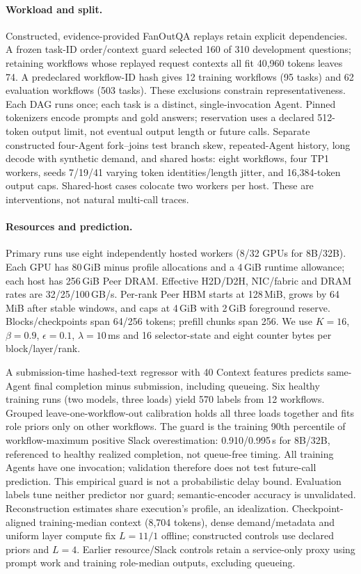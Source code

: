 \paragraph{Workload and split.}
Constructed, evidence-provided FanOutQA replays\cite{eval2024fanoutqa} retain
explicit dependencies. A frozen task-ID order/context guard selected 160 of
310 development questions; retaining workflows whose replayed request contexts
all fit 40,960 tokens leaves 74. A predeclared workflow-ID hash gives 12 training workflows (95 tasks) and
62 evaluation workflows (503 tasks). These exclusions constrain
representativeness. Each DAG runs once; each task is a distinct,
single-invocation Agent. Pinned tokenizers encode prompts and gold answers;
reservation uses a declared 512-token output limit, not eventual output length
or future calls.
Separate constructed four-Agent fork--joins test branch skew, repeated-Agent
history, long decode with synthetic demand, and shared hosts: eight workflows,
four TP1 workers, seeds 7/19/41 varying token identities/length jitter, and
16,384-token output caps. Shared-host cases colocate two workers per host.
These are interventions, not natural multi-call traces.

\paragraph{Resources and prediction.}
Primary runs use eight independently hosted workers (8/32 GPUs for 8B/32B).
Each GPU has 80\,GiB minus profile allocations and a 4\,GiB runtime allowance;
each host has 256\,GiB Peer DRAM. Effective H2D/D2H, NIC/fabric and DRAM rates
are 32/25/100\,GB/s. Per-rank Peer HBM starts at 128\,MiB, grows by 64\,MiB
after stable windows, and caps at 4\,GiB with 2\,GiB foreground reserve.
Blocks/checkpoints span 64/256 tokens; prefill chunks span 256.
We use $K=16$, $\beta=0.9$, $\epsilon=0.1$, $\lambda=10$\,ms and
16 selector-state and eight counter bytes per block/layer/rank.

A submission-time hashed-text regressor with 40 Context features predicts
same-Agent final completion minus submission, including queueing. Six healthy
training runs (two models, three loads) yield 570 labels from 12 workflows.
Grouped leave-one-workflow-out calibration holds all three loads together and
fits role priors only on other workflows. The guard is the training 90th
percentile of workflow-maximum positive Slack overestimation: 0.910/0.995\,s
for 8B/32B, referenced to healthy realized completion, not queue-free timing.
All training Agents have one invocation; validation therefore does not test
future-call prediction. This empirical guard is not a probabilistic delay bound.
Evaluation labels tune neither predictor nor guard; semantic-encoder accuracy
is unvalidated. Reconstruction estimates share execution's profile, an idealization.
Checkpoint-aligned training-median context (8,704 tokens), dense demand/metadata and uniform
layer compute fix $L=11/1$ offline; constructed controls use declared priors
and $L=4$. Earlier resource/Slack controls retain a service-only proxy using
prompt work and training role-median outputs, excluding queueing.

